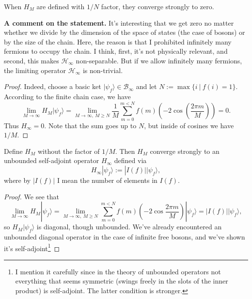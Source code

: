 \begin{statement}
When $H_M$ are defined with $1/N$ factor, they converge strongly to zero.
\end{statement}
\noindent\textbf{A comment on the statement.} It's interesting that we get zero no matter whether we divide by the dimension of the space of states (the case of bosons) or by the size of the chain. Here, the reason is that I prohibited infinitely many fermions to occupy the chain. I think, first, it's not physically relevant, and second, this makes $\mathcal H_{\infty}$ non-separable. But if we allow infinitely many fermions, the limiting operator $\mathcal H_{\infty}$ is non-trivial.
\begin{proof}
Indeed, choose a basic ket $|\psi_f \rangle \in \mathcal B_{\infty}$ and let $N := \max\{ i \ | \ f(i) = 1 \}$. According to the finite chain case, we have
\[
\lim_{M \rightarrow \infty} H_{M} |\psi_f \rangle = \lim_{M \rightarrow \infty, \ M \geq N} \frac{1}{M} \sum_{m=0}^{m < N} f(m) (-2\cos(\frac{2\pi m}{M})) = 0.
\]
Thus $H_{\infty} = 0$. Note that the sum goes up to $N$, but inside of cosines we have $1/M$.
\end{proof}
\begin{statement}
Define $H_{M}$ without the factor of $1/M$. Then $H_{M}$ converge strongly to an unbounded self-adjoint operator $H_{\infty}$ defined via
\[
H_{\infty} |\psi_f\rangle := |I(f)| |\psi_f\rangle, 
\]
where by $|I(f)|$ I mean the number of elements in $I(f)$.
\end{statement}
\begin{proof}
We see that
\[
\lim_{M \rightarrow \infty} H_M|\psi_f\rangle =  \lim_{M \rightarrow \infty, \ M \geq N} \sum_{m=0}^{m < N} f(m) (-2\cos\frac{2\pi m}{M} ) |\psi_f\rangle = |I(f)||\psi_f\rangle,
\]
so $H_M|\psi_f\rangle$ is diagonal, though unbounded. We've already encountered an unbounded diagonal operator in the case of infinite free bosons, and we've shown it's self-adjoint\footnote{I mention it carefully since in the theory of unbounded operators not everything that seems symmetric (swings freely in the slots of the inner product) is self-adjoint. The latter condition is stronger.}
\end{proof}

